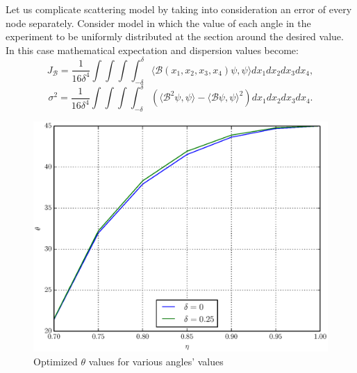 \documentclass[%
master,         %
subf,           %
href,           %
colorlinks=true %
]{disser}
\numberwithin{equation}{section}
\numberwithin{figure}{section}
\begin{document}
Let us complicate scattering model by taking into consideration an error of every node separately. Consider model in which the value of each angle in the experiment to be uniformly distributed at the section around the desired value. In this case 
mathematical expectation and dispersion values become: 
\[
J_\mathcal{B} = \frac{1}{16\delta^4}\int\int\int\int_{-\delta}^\delta \langle \mathcal{B}(x_1, x_2, x_3, x_4)\psi, \psi \rangle dx_1dx_2dx_3dx_4,
\] 
\[
\sigma^2 = \frac{1}{16\delta^4}\int\int\int\int_{-\delta}^\delta (\langle \mathcal{B}^2\psi, \psi \rangle - \langle \mathcal{B}\psi, \psi \rangle^2) dx_1dx_2dx_3dx_4.
\]

\begin{figure}[h]
\includegraphics[scale=0.7]{theta_4ang.eps}
\caption{Optimized $\theta$ values for various angles' values}
\label{fig:theta_4ang}
\end{figure}
\end{document}
